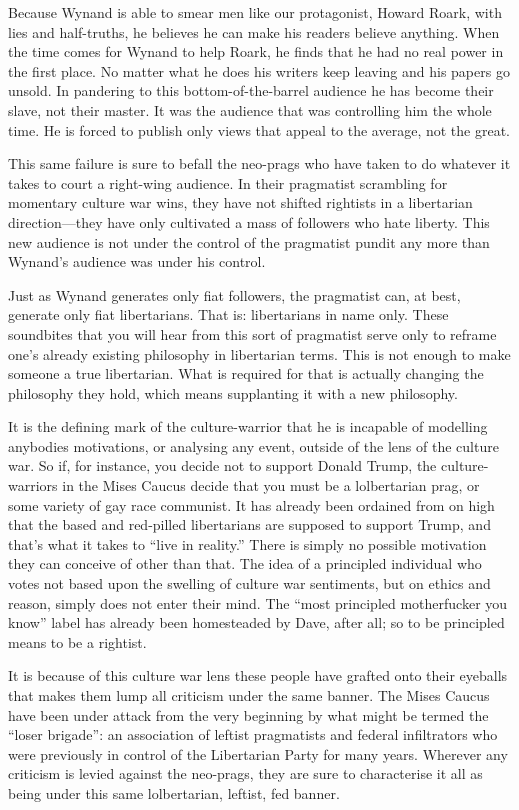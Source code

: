 \documentclass[11pt]{article}
\begin{document}
Because Wynand is able to smear men like our protagonist, Howard Roark, with lies and half-truths, he believes he can make his readers believe anything. When the time comes for Wynand to help Roark, he finds that he had no real power in the first place. No matter what he does his writers keep leaving and his papers go unsold. In pandering to this bottom-of-the-barrel audience he has become their slave, not their master. It was the audience that was controlling him the whole time. He is forced to publish only views that appeal to the average, not the great.

This same failure is sure to befall the neo-prags who have taken to do whatever it takes to court a right-wing audience. In their pragmatist scrambling for momentary culture war wins, they have not shifted rightists in a libertarian direction---they have only cultivated a mass of followers who hate liberty. This new audience is not under the control of the pragmatist pundit any more than Wynand's audience was under his control.

Just as Wynand generates only fiat followers, the pragmatist can, at best, generate only fiat libertarians. That is: libertarians in name only. These soundbites that you will hear from this sort of pragmatist serve only to reframe one's already existing philosophy in libertarian terms. This is not enough to make someone a true libertarian. What is required for that is actually changing the philosophy they hold, which means supplanting it with a new philosophy.

It is the defining mark of the culture-warrior that he is incapable of modelling anybodies motivations, or analysing any event, outside of the lens of the culture war. So if, for instance, you decide not to support Donald Trump, the culture-warriors in the Mises Caucus decide that you must be a lolbertarian prag, or some variety of gay race communist. It has already been ordained from on high that the based and red-pilled libertarians are supposed to support Trump, and that's what it takes to ``live in reality.'' There is simply no possible motivation they can conceive of other than that. The idea of a principled individual who votes not based upon the swelling of culture war sentiments, but on ethics and reason, simply does not enter their mind. The ``most principled motherfucker you know'' label has already been homesteaded by Dave, after all; so to be principled means to be a rightist.

It is because of this culture war lens these people have grafted onto their eyeballs that makes them lump all criticism under the same banner. The Mises Caucus have been under attack from the very beginning by what might be termed the ``loser brigade'': an association of leftist pragmatists and federal infiltrators who were previously in control of the Libertarian Party for many years. Wherever any criticism is levied against the neo-prags, they are sure to characterise it all as being under this same lolbertarian, leftist, fed banner.
\end{document}
